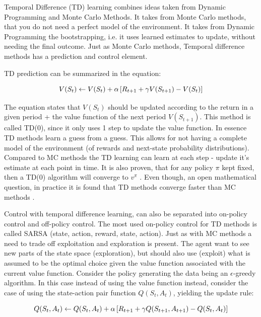 Temporal Difference (TD) learning combines ideas taken from Dynamic Programming and Monte Carlo Methods. It takes from Monte Carlo methods, that you do not need a perfect model of the environment. It takes from Dynamic Programming the bootstrapping, i.e. it uses learned estimates to update, without needing the final outcome. Just as Monte Carlo methods, Temporal difference methods has a prediction and control element.

TD prediction can be summarized in the equation:

\begin{equation}
    V(S_t) \leftarrow V(S_t) + \alpha \left[ R_{t+1} + \gamma V(S_{t+1}) - V(S_t) \right]
\end{equation}

The equation states that $V(S_t)$ should be updated according to the return in a given period + the value function of the next period $V(S_{t+1})$. This method is called TD(0), since it only uses 1 step to update the value function. In essence TD methods learn a guess from a guess. This allows for not having a complete model of the environment (of rewards and next-state probability distributions). Compared to MC methods the TD learning can learn at each step - update it's estimate at each point in time. It is also proven, that for any policy $\pi$ kept fixed, then a TD(0) algorithm will converge to $v^{\pi}$ \parencite{sutton_reinforcement_2018}. Even though, an open mathematical question, in practice it is found that TD methods converge faster than MC methods \parencite{sutton_reinforcement_2018}.

Control with temporal difference learning, can also be separated into on-policy control and off-policy control. The most used on-policy control for TD methods is called SARSA (state, action, reward, state, action). Just as with MC methods a need to trade off exploitation and exploration is present. The agent want to see new parts of the state space (exploration), but should also use (exploit) what is assumed to be the optimal choice given the value function associated with the current value function. Consider the policy generating the data being an $\epsilon$-greedy algorithm. In this case instead of using the value function instead, consider the case of using the state-action pair function $Q(S_t, A_t)$, yielding the update rule:

\begin{equation}
    Q(S_t, A_t) \leftarrow Q(S_t, A_t) + \alpha \left[ R_{t+1} + \gamma Q(S_{t+1}, A_{t+1}) - Q(S_t, A_t) \right]
\end{equation}

